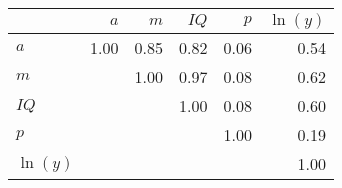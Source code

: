 \begin{tabular}{lrrrrr}
\hline
 & $a$  & $m$  & $IQ$  & $p$  & $\ln(y)$  \\
\hline
$a$ & 1.00  & 0.85  & 0.82  & 0.06  & 0.54  \\
$m$ &   & 1.00  & 0.97  & 0.08  & 0.62  \\
$IQ$ &   &   & 1.00  & 0.08  & 0.60  \\
$p$ &   &   &   & 1.00  & 0.19  \\
$\ln(y)$ &   &   &   &   & 1.00  \\
\hline
\end{tabular}%
